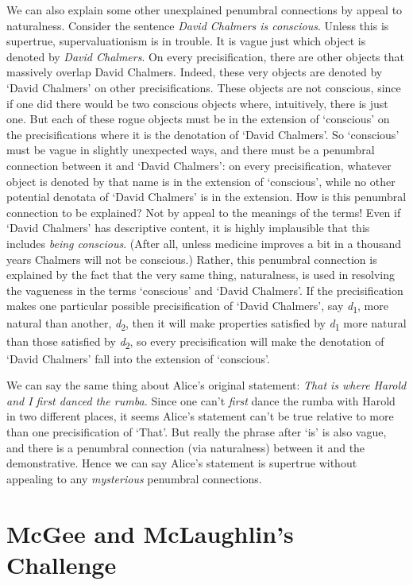 \documentclass[
  10pt,
  letterpaper,
  DIV=11,
  numbers=noendperiod,
  twoside]{scrartcl}
\begin{document}
We can also explain some other unexplained penumbral connections by
appeal to naturalness. Consider the sentence \emph{David Chalmers is
conscious}. Unless this is supertrue, supervaluationism is in trouble.
It is vague just which object is denoted by \emph{David Chalmers}. On
every precisification, there are other objects that massively overlap
David Chalmers. Indeed, these very objects are denoted by `David
Chalmers' on other precisifications. These objects are not conscious,
since if one did there would be two conscious objects where,
intuitively, there is just one. But each of these rogue objects must be
in the extension of `conscious' on the precisifications where it is the
denotation of `David Chalmers'. So `conscious' must be vague in slightly
unexpected ways, and there must be a penumbral connection between it and
`David Chalmers': on every precisification, whatever object is denoted
by that name is in the extension of `conscious', while no other
potential denotata of `David Chalmers' is in the extension. How is this
penumbral connection to be explained? Not by appeal to the meanings of
the terms! Even if `David Chalmers' has descriptive content, it is
highly implausible that this includes \emph{being conscious}. (After
all, unless medicine improves a bit in a thousand years Chalmers will
not be conscious.) Rather, this penumbral connection is explained by the
fact that the very same thing, naturalness, is used in resolving the
vagueness in the terms `conscious' and `David Chalmers'. If the
precisification makes one particular possible precisification of `David
Chalmers', say \emph{d}\textsubscript{1}, more natural than another,
\emph{d}\textsubscript{2}, then it will make properties satisfied by
\emph{d}\textsubscript{1­} more natural than those satisfied by
\emph{d}\textsubscript{2}, so every precisification will make the
denotation of `David Chalmers' fall into the extension of `conscious'.

We can say the same thing about Alice's original statement: \emph{That
is where Harold and I first danced the rumba.} Since one can't
\emph{first} dance the rumba with Harold in two different places, it
seems Alice's statement can't be true relative to more than one
precisification of `That'. But really the phrase after `is' is also
vague, and there is a penumbral connection (via naturalness) between it
and the demonstrative. Hence we can say Alice's statement is supertrue
without appealing to any \emph{mysterious} penumbral connections.

\section{McGee and McLaughlin's
Challenge}\label{mcgee-and-mclaughlins-challenge}
\end{document}
